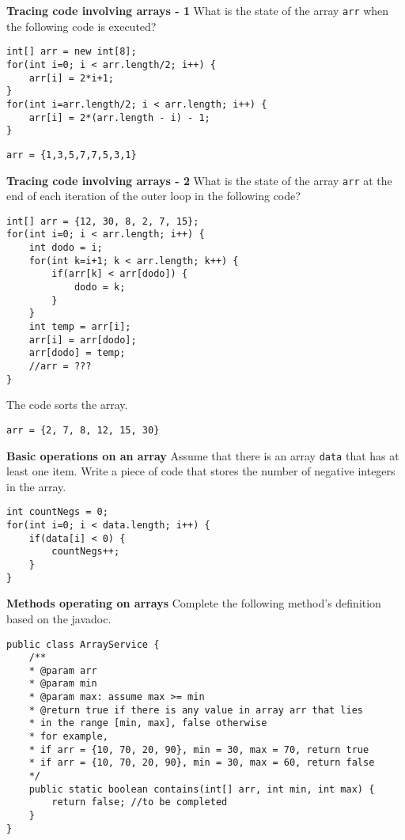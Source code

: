 \begin{questions}
\question \textbf{Tracing code involving arrays - 1}
What is the state of the array \texttt{arr} when the following code is executed? 

\begin{lstlisting}
int[] arr = new int[8];
for(int i=0; i < arr.length/2; i++) {
	arr[i] = 2*i+1;
}
for(int i=arr.length/2; i < arr.length; i++) {
	arr[i] = 2*(arr.length - i) - 1;
}
\end{lstlisting}
\ifprintanswers
\begin{verbatim}
arr = {1,3,5,7,7,5,3,1}  
\end{verbatim}
\else
\newpage
\fi

\question \textbf{Tracing code involving arrays - 2}
What is the state of the array \texttt{arr} at the end of each iteration of the outer loop in the following code?
\begin{lstlisting}
int[] arr = {12, 30, 8, 2, 7, 15};
for(int i=0; i < arr.length; i++) {
	int dodo = i;
	for(int k=i+1; k < arr.length; k++) {
		if(arr[k] < arr[dodo]) {
			dodo = k;
		}
	}
	int temp = arr[i];
	arr[i] = arr[dodo];
	arr[dodo] = temp;	
	//arr = ???
}
\end{lstlisting}
\ifprintanswers
The code sorts the array.
\begin{verbatim}
arr = {2, 7, 8, 12, 15, 30}  
\end{verbatim}
\else
\fi

\question \textbf{Basic operations on an array}
Assume that there is an array \texttt{data} that has at least one item. Write a piece of code that stores the number of negative integers in the array.

\ifprintanswers
\begin{lstlisting}
int countNegs = 0;
for(int i=0; i < data.length; i++) {
	if(data[i] < 0) {
		countNegs++;
	}
}
\end{lstlisting}
\else
\fi

\question \textbf{Methods operating on arrays}
Complete the following method's definition based on the javadoc.

\begin{lstlisting}[style=junit]
public class ArrayService {
	/**
	* @param arr
	* @param min
	* @param max: assume max >= min
	* @return true if there is any value in array arr that lies
	* in the range [min, max], false otherwise
	* for example,
	* if arr = {10, 70, 20, 90}, min = 30, max = 70, return true
	* if arr = {10, 70, 20, 90}, min = 30, max = 60, return false
	*/
	public static boolean contains(int[] arr, int min, int max) {
		return false; //to be completed
	}
}
\end{lstlisting}


\end{questions}
